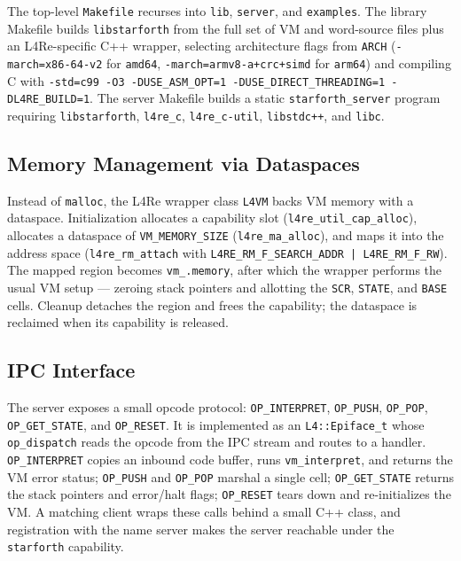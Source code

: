 The top-level \texttt{Makefile} recurses into \texttt{lib}, \texttt{server},
and \texttt{examples}. The library Makefile builds \texttt{libstarforth} from
the full set of VM and word-source files plus an L4Re-specific C++ wrapper,
selecting architecture flags from \texttt{ARCH} (\texttt{-march=x86-64-v2} for
\texttt{amd64}, \texttt{-march=armv8-a+crc+simd} for \texttt{arm64}) and
compiling C with \texttt{-std=c99 -O3 -DUSE\_ASM\_OPT=1
-DUSE\_DIRECT\_THREADING=1 -DL4RE\_BUILD=1}. The server Makefile builds a
static \texttt{starforth\_server} program requiring \texttt{libstarforth},
\texttt{l4re\_c}, \texttt{l4re\_c-util}, \texttt{libstdc++}, and \texttt{libc}.

\subsection{Memory Management via Dataspaces}

Instead of \texttt{malloc}, the L4Re wrapper class \texttt{L4VM} backs VM
memory with a dataspace. Initialization allocates a capability slot
(\texttt{l4re\_util\_cap\_alloc}), allocates a dataspace of
\texttt{VM\_MEMORY\_SIZE} (\texttt{l4re\_ma\_alloc}), and maps it into the
address space (\texttt{l4re\_rm\_attach} with
\texttt{L4RE\_RM\_F\_SEARCH\_ADDR | L4RE\_RM\_F\_RW}). The mapped region becomes
\texttt{vm\_.memory}, after which the wrapper performs the usual VM setup ---
zeroing stack pointers and allotting the \texttt{SCR}, \texttt{STATE}, and
\texttt{BASE} cells. Cleanup detaches the region and frees the capability; the
dataspace is reclaimed when its capability is released.

\subsection{IPC Interface}

The server exposes a small opcode protocol: \texttt{OP\_INTERPRET},
\texttt{OP\_PUSH}, \texttt{OP\_POP}, \texttt{OP\_GET\_STATE}, and
\texttt{OP\_RESET}. It is implemented as an \texttt{L4::Epiface\_t} whose
\texttt{op\_dispatch} reads the opcode from the IPC stream and routes to a
handler. \texttt{OP\_INTERPRET} copies an inbound code buffer, runs
\texttt{vm\_interpret}, and returns the VM error status; \texttt{OP\_PUSH} and
\texttt{OP\_POP} marshal a single cell; \texttt{OP\_GET\_STATE} returns the
stack pointers and error/halt flags; \texttt{OP\_RESET} tears down and
re-initializes the VM. A matching client wraps these calls behind a small C++
class, and registration with the name server makes the server reachable under
the \texttt{starforth} capability.

